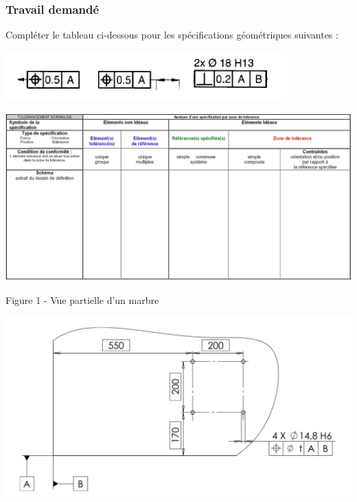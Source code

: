 \subsubsection{Travail demandé}
Compléter le tableau ci-dessous pour les spécifications géométriques suivantes : 
\begin{center}
    \includegraphics[scale=0.5]{png/tube_data.png}
\end{center}
\begin{center}
    \includegraphics[scale=0.65]{png/doc_rep.png}
\end{center}

\newpage



Figure 1 - Vue partielle d'un marbre
\begin{center}
    \includegraphics[scale=0.5]{png/marbre.png}
\end{center}

